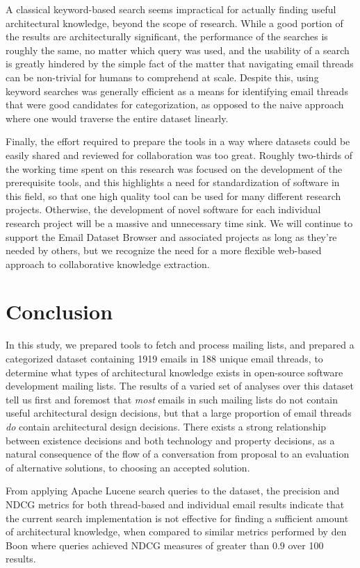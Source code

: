 \documentclass[a4paper, 12pt]{article}
\begin{document}
	A classical keyword-based search seems impractical for actually finding useful architectural knowledge, beyond the scope of research. While a good portion of the results are architecturally significant, the performance of the searches is roughly the same, no matter which query was used, and the usability of a search is greatly hindered by the simple fact of the matter that navigating email threads can be non-trivial for humans to comprehend at scale. Despite this, using keyword searches was generally efficient as a means for identifying email threads that were good candidates for categorization, as opposed to the naive approach where one would traverse the entire dataset linearly.
	
	Finally, the effort required to prepare the tools in a way where datasets could be easily shared and reviewed for collaboration was too great. Roughly two-thirds of the working time spent on this research was focused on the development of the prerequisite tools, and this highlights a need for standardization of software in this field, so that one high quality tool can be used for many different research projects. Otherwise, the development of novel software for each individual research project will be a massive and unnecessary time sink. We will continue to support the Email Dataset Browser and associated projects as long as they're needed by others, but we recognize the need for a more flexible web-based approach to collaborative knowledge extraction.

\section{Conclusion}
	In this study, we prepared tools to fetch and process mailing lists, and prepared a categorized dataset containing 1919 emails in 188 unique email threads, to determine what types of architectural knowledge exists in open-source software development mailing lists. The results of a varied set of analyses over this dataset tell us first and foremost that \textit{most} emails in such mailing lists do not contain useful architectural design decisions, but that a large proportion of email threads \textit{do} contain architectural design decisions. There exists a strong relationship between existence decisions and both technology and property decisions, as a natural consequence of the flow of a conversation from proposal to an evaluation of alternative solutions, to choosing an accepted solution.
	
	From applying Apache Lucene search queries to the dataset, the precision and NDCG metrics for both thread-based and individual email results indicate that the current search implementation is not effective for finding a sufficient amount of architectural knowledge, when compared to similar metrics performed by den Boon\cite{denboon} where queries achieved NDCG measures of greater than $ 0.9 $ over 100 results.
	
\end{document}
